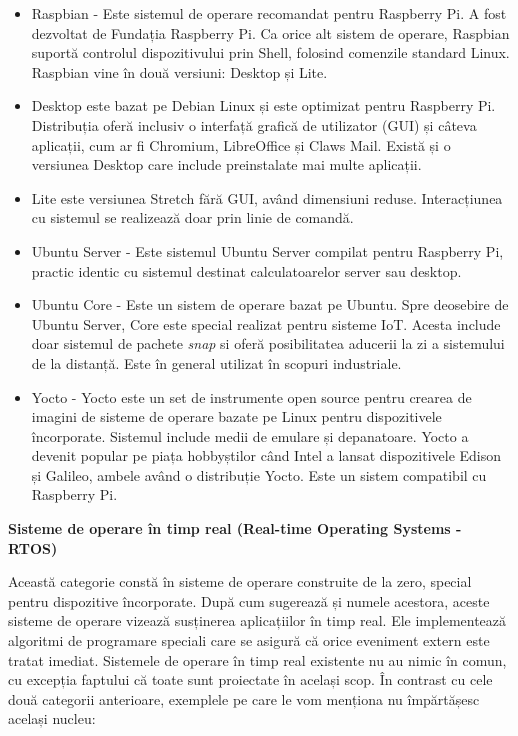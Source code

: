 \begin{itemize}
	\item Raspbian - Este sistemul de operare recomandat pentru Raspberry
		Pi. A fost dezvoltat de Fundația Raspberry Pi. Ca orice alt
		sistem de operare, Raspbian suportă controlul dispozitivului
		prin Shell, folosind comenzile standard Linux. Raspbian vine în
		două versiuni: Desktop și Lite.
	\item Desktop este bazat pe Debian Linux și este optimizat pentru
		Raspberry Pi. Distribuția oferă inclusiv o interfață grafică de
		utilizator (GUI) și câteva aplicații, cum ar fi Chromium,
		LibreOffice și Claws Mail. Există și o versiunea Desktop care include
		preinstalate mai multe aplicații.
	\item Lite este versiunea Stretch fără GUI, având dimensiuni
		reduse. Interacțiunea cu sistemul se realizează doar prin linie
		de comandă.
	\item Ubuntu Server - Este sistemul Ubuntu Server compilat pentru Raspberry Pi, 
		practic identic cu sistemul destinat calculatoarelor server sau desktop.
	\item Ubuntu Core - Este un sistem de operare bazat pe Ubuntu. Spre deosebire
		de Ubuntu Server, Core este special realizat pentru sisteme IoT.
		Acesta include doar sistemul de pachete \textit{snap} si oferă posibilitatea
		aducerii la zi a sistemului de la distanță. Este în general utilizat 
		în scopuri industriale.
	\item Yocto - Yocto este un set de instrumente open source pentru
		crearea de imagini de sisteme de operare bazate pe Linux pentru
		dispozitivele încorporate. Sistemul include medii de emulare și
		depanatoare. Yocto a devenit popular pe piața hobbyștilor când
		Intel a lansat dispozitivele Edison și Galileo, ambele având o
		distribuție Yocto. Este un sistem compatibil cu Raspberry Pi.
\end{itemize}

\textbf{Sisteme de operare în timp real (Real-time Operating Systems - RTOS)}

Această categorie constă în sisteme de operare construite de la zero, special
pentru dispozitive încorporate. După cum sugerează și numele acestora, aceste
sisteme de operare vizează susținerea aplicațiilor în timp real. Ele
implementează algoritmi de programare speciali care se asigură că orice
eveniment extern este tratat imediat. Sistemele de operare în timp real existente
nu au nimic în comun, cu excepția faptului că toate sunt proiectate în același
scop. În contrast cu cele două categorii anterioare, exemplele pe care le vom
menționa nu împărtășesc același nucleu:

